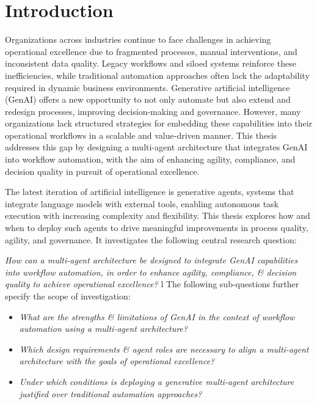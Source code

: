 \section{Introduction}
Organizations across industries continue to face challenges in achieving operational excellence due to fragmented processes, manual interventions, and inconsistent data quality. Legacy workflows and siloed systems reinforce these inefficiencies, while traditional automation approaches often lack the adaptability required in dynamic business environments. Generative artificial intelligence (GenAI) offers a new opportunity to not only automate but also extend and redesign processes, improving decision-making and governance. However, many organizations lack structured strategies for embedding these capabilities into their operational workflows in a scalable and value-driven manner. This thesis addresses this gap by designing a multi-agent architecture that integrates GenAI into workflow automation, with the aim of enhancing agility, compliance, and decision quality in pursuit of operational excellence.

The latest iteration of artificial intelligence is generative agents, systems that integrate language models with external tools, enabling autonomous task execution with increasing complexity and flexibility. This thesis explores how and when to deploy such agents to drive meaningful improvements in process quality, agility, and governance. It investigates the following central research question:

\vspace{0.5\baselineskip}
\emph{How can a multi-agent architecture be designed to integrate GenAI capabilities into workflow automation, in order to enhance agility, compliance, \& decision quality to achieve operational excellence?}
\vspace{0.5\baselineskip}
l
The following sub-questions further specify the scope of investigation:
\begin{itemize}
    \item \emph{What are the strengths \& limitations of GenAI in the context of workflow automation using a multi-agent architecture?}
    \item \emph{Which design requirements \& agent roles are necessary to align a multi-agent architecture with the goals of operational excellence?}
    \item \emph{Under which conditions is deploying a generative multi-agent architecture justified over traditional automation approaches?}
\end{itemize}

